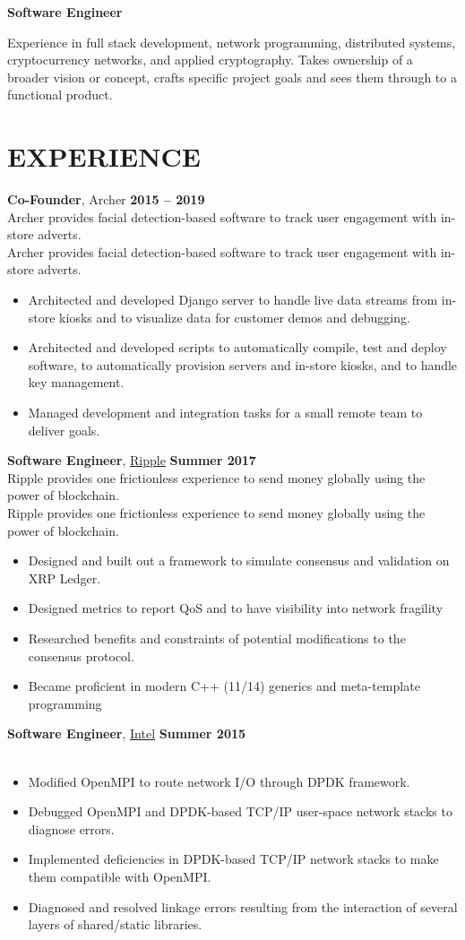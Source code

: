 \documentclass[10pt, center]{res} %
\newcommand{\pad}{\vspace{2pt}}
\newcommand{\unpad}{\vspace{-2pt}}
\newcommand{\bullets}[1]{
	\begin{itemize}[noitemsep]
		#1
	\end{itemize}
	\vspace{-6pt}
}
\newcommand{\experience}[5]{
	{\bf #1}, #2 \hfill {\bf #3} \\ \vspace{-10pt}
	\ifx\hfbuzz#4\hfbuzz
		\vspace{-4pt}
	\else
		{\vspace{-4pt} \\ #4}
	\fi
	\bullets{#5}
}
\begin{document}
\address{jmmcgee.00@gmail.com | (323) 557-8647}
\begin{resume}

\pad
\centerline{\textbf{\huge Software Engineer}}
\parbox{\textwidth}{
	Experience in full stack development, network programming, distributed systems, cryptocurrency networks, and applied cryptography. Takes ownership of a broader vision or concept, crafts specific project goals and sees them through to a functional product.
}

\unpad
\section{EXPERIENCE}
	\experience{Co-Founder}{Archer}{2015 -- 2019}{
	Archer provides facial detection-based software to track user engagement with in-store adverts.}{
		\item Architected and developed Django server to handle live data streams from in-store kiosks and to visualize data for customer demos and debugging.
		\item Architected and developed scripts to automatically compile, test and deploy software, to automatically provision servers and in-store kiosks, and to handle key management.
		\item Managed development and integration tasks for a small remote team to deliver goals.
	}

    \experience{Software Engineer}{\href{https://ripple.com/}{Ripple}}{Summer 2017}{
   	Ripple provides one frictionless experience to send money globally using the power of blockchain.}{
		\item Designed and built out a framework to simulate consensus and validation on XRP Ledger.
		\item Designed metrics to report QoS and  to have visibility into network fragility
		\item Researched benefits and constraints of potential modifications to the consensus protocol.
		\item Became proficient in modern C++ (11/14) generics and meta-template programming
    }

    \experience{Software Engineer}{\href{https://www.intel.com}{Intel}}{Summer 2015}{}{
		\item Modified OpenMPI to route network I/O through DPDK framework.
		\item Debugged OpenMPI and DPDK-based TCP/IP user-space network stacks to diagnose errors.
		\item Implemented deficiencies in DPDK-based TCP/IP network stacks to make them compatible with OpenMPI.
		\item Diagnosed and resolved linkage errors resulting from the interaction of several layers of shared/static libraries.
    }


\end{resume}
\end{document}
